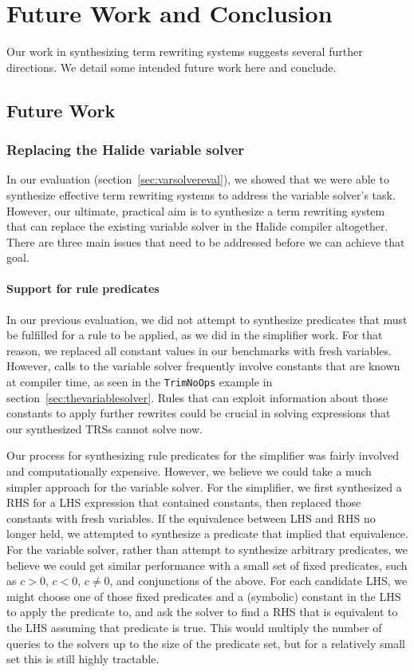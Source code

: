 \chapter{Future Work and Conclusion}
\label{chapter:conclusion}

Our work in synthesizing term rewriting systems suggests several further directions. We detail some intended future work here and conclude.

\section{Future Work}

\subsection{Replacing the Halide variable solver}
\label{sec:varsolverreplacement}

In our evaluation (section~\ref{sec:varsolvereval}), we showed that we were able to synthesize effective term rewriting systems to address the variable solver's task. However, our ultimate, practical aim is to synthesize a term rewriting system that can replace the existing variable solver in the Halide compiler altogether. There are three main issues that need to be addressed before we can achieve that goal.

\subsubsection{Support for rule predicates}
In our previous evaluation, we did not attempt to synthesize predicates that must be fulfilled for a rule to be applied, as we did in the simplifier work. For that reason, we replaced all constant values in our benchmarks with fresh variables. However, calls to the variable solver frequently involve constants that are known at compiler time, as seen in the \texttt{TrimNoOps} example in section~\ref{sec:thevariablesolver}. Rules that can exploit information about those constants to apply further rewrites could be crucial in solving expressions that our synthesized TRSs cannot solve now.

Our process for synthesizing rule predicates for the simplifier was fairly involved and computationally expensive. However, we believe we could take a much simpler approach for the variable solver. For the simplifier, we first synthesized a RHS for a LHS expression that contained constants, then replaced those constants with fresh variables. If the equivalence between LHS and RHS no longer held, we attempted to synthesize a predicate that implied that equivalence. For the variable solver, rather than attempt to synthesize arbitrary predicates, we believe we could get similar performance with a small set of fixed predicates, such as $c > 0$, $c < 0$, $c \neq 0$, and conjunctions of the above. For each candidate LHS, we might choose one of those fixed predicates and a (symbolic) constant in the LHS to apply the predicate to, and ask the solver to find a RHS that is equivalent to the LHS assuming that predicate is true. This would multiply the number of queries to the solvers up to the size of the predicate set, but for a relatively small set this is still highly tractable.

